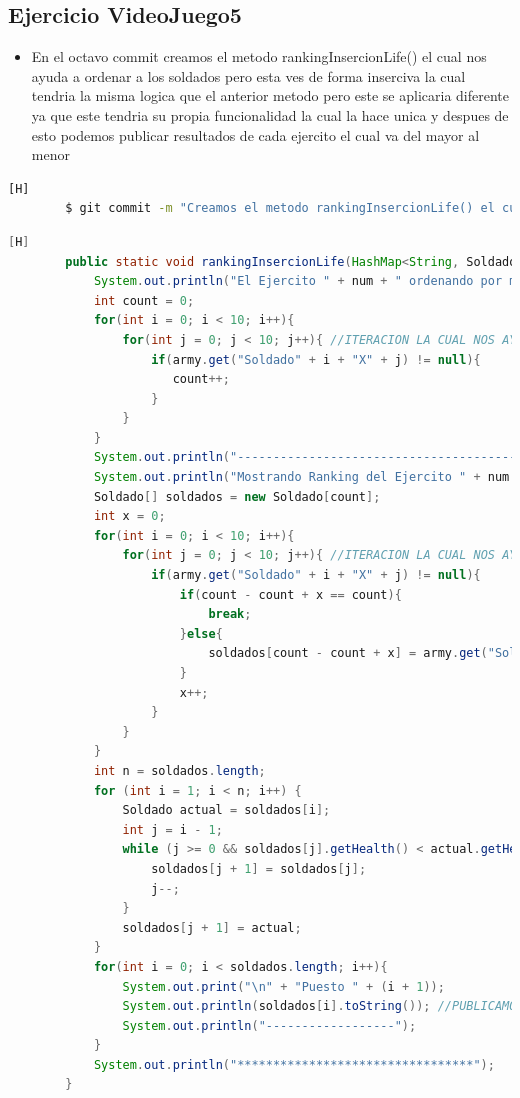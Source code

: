 \documentclass{article}
\begin{document}
	\subsection{Ejercicio VideoJuego5}
	\begin{itemize}	
		\item En el octavo commit creamos el metodo rankingInsercionLife() el cual nos ayuda a ordenar a los soldados pero esta ves de forma inserciva la cual tendria la misma logica que el anterior metodo pero este se aplicaria diferente ya que este tendria su propia funcionalidad la cual la hace unica y despues de esto podemos publicar resultados de cada ejercito el cual va del mayor al menor
	\end{itemize}	
	\begin{lstlisting}[language=bash,caption={Commit}][H]
		$ git commit -m "Creamos el metodo rankingInsercionLife() el cual nos ayuda a ordenar a los soldados pero esta ves de forma inserciva la cual tendria la misma logica que el anterior metodo pero este se aplicaria diferente ya que este tendria su propia funcionalidad la cual la hace unica y despues de esto podemos publicar resultados de cada ejercito el cual va del mayor al menor"
	\end{lstlisting}	
	\begin{lstlisting}[language=java,caption={Las lineas de codigos del metodo creado:}][H]
		public static void rankingInsercionLife(HashMap<String, Soldado> army , int num){
			System.out.println("El Ejercito " + num + " ordenando por metodo insercion: ");
			int count = 0;
			for(int i = 0; i < 10; i++){
				for(int j = 0; j < 10; j++){ //ITERACION LA CUAL NOS AYUDA A PASAR POR TODOS LOS SOLDADOS DE CADA EJERCITO
					if(army.get("Soldado" + i + "X" + j) != null){ 
					   count++;
					}
				}
			}
			System.out.println("------------------------------------------");
			System.out.println("Mostrando Ranking del Ejercito " + num + " ..... ////// --->");
			Soldado[] soldados = new Soldado[count];
			int x = 0;
			for(int i = 0; i < 10; i++){
				for(int j = 0; j < 10; j++){ //ITERACION LA CUAL NOS AYUDA A PASAR POR TODOS LOS SOLDADOS AL ARRAY SOLDADO PARA PODER USAR EL USO DEL METODO DE ORDENACION INSERCION
					if(army.get("Soldado" + i + "X" + j) != null){ 
						if(count - count + x == count){
							break;
						}else{
							soldados[count - count + x] = army.get("Soldado" + i + "X" + j); //LA MISMA LOGICA QUE EL ANTERIOR METODO SOLO QUE EN ESTE LO USARIAMOS DE MANERA DIFERENTE YA QUE ESTE SERIA DE FORMA DE INSERCION
						}
						x++;   
					}
				}
			}
			int n = soldados.length;
			for (int i = 1; i < n; i++) {
				Soldado actual = soldados[i];
				int j = i - 1;
				while (j >= 0 && soldados[j].getHealth() < actual.getHealth()) { //ORDENAMOS EL EJERCITO RESPECTIVAMENTE MEDIANTE EL METODO QUE NOS OFRECE INSERCION EL CUAL ES ESTE CODIGO
					soldados[j + 1] = soldados[j];
					j--;
				}
				soldados[j + 1] = actual;
			}
			for(int i = 0; i < soldados.length; i++){
				System.out.print("\n" + "Puesto " + (i + 1));
				System.out.println(soldados[i].toString()); //PUBLICAMOS RESULTADOS
				System.out.println("------------------");
			}
			System.out.println("*********************************");
		}
	\end{lstlisting}
\end{document}
